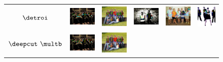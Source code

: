 \begin{figure}
  \centering
  \begin{tabular}{c c c c c c}
  \begin{sideways}\bf \small \quad\quad $\detroi$\end{sideways}&
  \includegraphics[height=0.150\linewidth]{imgidx_0012_sticks_unary_waf.pdf}&
  \includegraphics[height=0.150\linewidth]{imgidx_0045_sticks_unary_waf.pdf}&
  \includegraphics[height=0.150\linewidth]{imgidx_0070_sticks_unary_waf.pdf}&
  \includegraphics[height=0.150\linewidth]{imgidx_0167_sticks_unary_waf.pdf}&
  \includegraphics[height=0.150\linewidth]{imgidx_0169_sticks_unary_waf.pdf}\\
  \begin{sideways}\bf \small\quad $\deepcut~\multb$\end{sideways}&
  \includegraphics[height=0.150\linewidth]{imgidx_0012_sticks_waf.pdf}&
  \includegraphics[height=0.150\linewidth]{imgidx_0045_sticks_waf.pdf}&

\end{tabular}
\end{figure}
